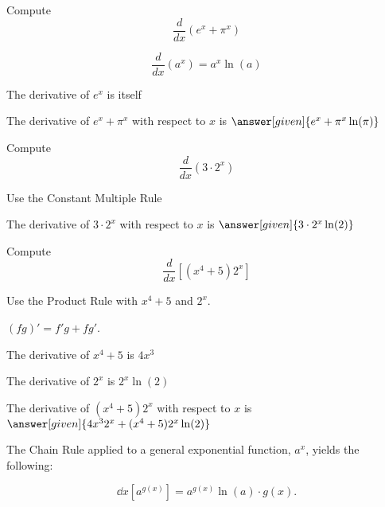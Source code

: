 \documentclass{ximera}
\begin{document}
\begin{problem} %
  Compute 
  \[
  \frac{d}{dx} \left(e^x + \pi^x\right)
  \]
  
    \begin{hint}
      \[
      \frac{d}{dx} \left(a^x\right) = a^x \ln(a)
      \]
    \end{hint}
		\begin{hint}
		  The derivative of $e^x$ is itself
		\end{hint}
		The derivative of $e^x + \pi^x$ with respect to $x$ is
		 $\answer[given]{e^x  + \pi^x \ln(\pi)}$
	
\end{problem}


\begin{problem} %
  Compute 
  \[
  \frac{d}{dx} \left(3\cdot 2^x\right)
  \]
    
    \begin{hint}
		  Use the Constant Multiple Rule
		\end{hint}
    
		
		The derivative of $3\cdot 2^x$ with respect to $x$ is
		 $\answer[given]{3\cdot 2^x \ln(2)}$
	
\end{problem}



\begin{problem} %
  Compute
  \[
  \frac{d}{dx} \left[(x^4 + 5)2^x\right]
  \]
  
    \begin{hint}
      Use the Product Rule with $x^4 + 5$ and $2^x$.
    \end{hint}
    \begin{hint}
      $(fg)' = f'g+fg'$.
    \end{hint}
    \begin{hint}
      The derivative of $x^4 + 5$ is $4x^3$
    \end{hint}
    \begin{hint}
      The derivative of $2^x$ is $2^x \ln(2)$
    \end{hint}
		The derivative of $(x^4 + 5)2^x$ with respect to $x$ is
		 $\answer[given]{4x^3 2^x + (x^4 + 5) 2^x \ln(2)}$
		
\end{problem}


The Chain Rule applied to a general exponential function, $a^x$, yields the following:

\[
\dd{x} \left[a^{g(x)}\right] = a^{g(x)} \ln(a) \cdot g(x).
\]
\end{document}
